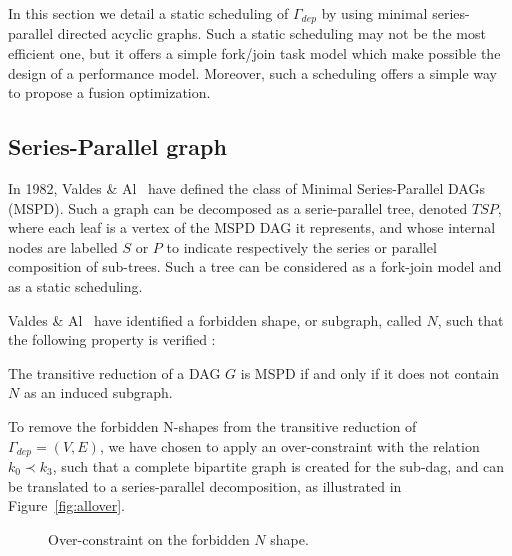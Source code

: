 In this section we detail a static scheduling of $\Gamma_{dep}$ by using minimal series-parallel directed acyclic graphs. Such a static scheduling may not be the most efficient one, but it offers a simple fork/join task model which make possible the design of a performance model. Moreover, such a scheduling offers a simple way to propose a fusion optimization. 

\subsection{Series-Parallel graph}
\label{sect:tsp}

In 1982, Valdes \& Al~\cite{Valdes:1979:RSP:800135.804393} have defined the class of Minimal Series-Parallel DAGs (MSPD). Such a graph can be decomposed as a serie-parallel tree, denoted $TSP$, where each leaf is a vertex of the MSPD DAG it represents, and whose internal nodes are labelled $S$ or $P$ to indicate respectively the series or parallel composition of sub-trees. Such a tree can be considered as a fork-join model and as a static scheduling.

Valdes \& Al~\cite{Valdes:1979:RSP:800135.804393} have identified a forbidden shape, or subgraph, called $N$, such that the following property is verified :

\begin{myth}
The transitive reduction of a DAG $G$ is MSPD if and only if it does not contain $N$ as an induced subgraph.
\end{myth}

To remove the forbidden N-shapes from the transitive reduction of $\Gamma_{dep}=(V,E)$, we have chosen to apply an over-constraint with the relation $k_0 \prec k_3$, such that a complete bipartite graph is created for the sub-dag, and can be translated to a series-parallel decomposition, as illustrated in Figure~\ref{fig:allover}.

\begin{figure}[h!]
\begin{center}
\caption{Over-constraint on the forbidden $N$ shape.}
\label{fig:over}
\end{center}
\end{figure}

